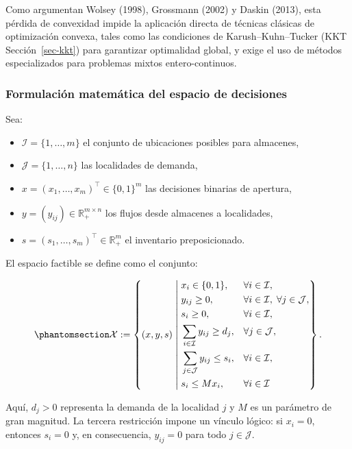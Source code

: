 \documentclass[
  spanish,
  us-letterpaper,
]{scrreprt}
\providecommand{\tightlist}{%
  \setlength{\itemsep}{0pt}\setlength{\parskip}{0pt}}
\numberwithin{equation}{section}
\begin{document}
Como argumentan Wolsey (1998), Grossmann (2002) y Daskin (2013), esta
pérdida de convexidad impide la aplicación directa de técnicas clásicas
de optimización convexa, tales como las condiciones de
Karush--Kuhn--Tucker (KKT Sección~\ref{sec-kkt}) para garantizar
optimalidad global, y exige el uso de métodos especializados para
problemas mixtos entero-continuos.

\subsubsection{Formulación matemática del espacio de
decisiones}\label{sec-noconvexidad}

Sea:

\begin{itemize}
\tightlist
\item
  \(\mathcal{I} = \{1,\ldots,m\}\) el conjunto de ubicaciones posibles
  para almacenes,
\item
  \(\mathcal{J} = \{1,\ldots,n\}\) las localidades de demanda,
\item
  \(x = (x_1,\dots,x_m)^\top \in \{0,1\}^m\) las decisiones binarias de
  apertura,
\item
  \(y = (y_{ij}) \in \mathbb{R}_+^{m\times n}\) los flujos desde
  almacenes a localidades,
\item
  \(s = (s_1,\dots,s_m)^\top \in \mathbb{R}_+^m\) el inventario
  preposicionado.
\end{itemize}

El espacio factible se define como el conjunto:

\begin{equation}\phantomsection\label{eq-EF}{
\mathcal{X} := \left\{ (x, y, s) \;\middle|\;
\begin{aligned}
& x_i \in \{0,1\}, && \forall i \in \mathcal{I}, \\
& y_{ij} \ge 0,    && \forall i \in \mathcal{I},\; \forall j \in \mathcal{J}, \\
& s_i \ge 0,       && \forall i \in \mathcal{I}, \\
& \sum_{i \in \mathcal{I}} y_{ij} \ge d_j, && \forall j \in \mathcal{J}, \\
& \sum_{j \in \mathcal{J}} y_{ij} \le s_i, && \forall i \in \mathcal{I}, \\
& s_i \le M x_i,   && \forall i \in \mathcal{I}
\end{aligned}
\right\}.
}\end{equation}

Aquí, \(d_j > 0\) representa la demanda de la localidad \(j\) y \(M\) es
un parámetro de gran magnitud. La tercera restricción impone un vínculo
lógico: si \(x_i = 0\), entonces \(s_i = 0\) y, en consecuencia,
\(y_{ij} = 0\) para todo \(j \in \mathcal{J}\).
\end{document}
